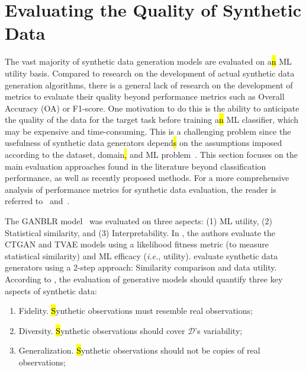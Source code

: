 \section{Evaluating the Quality of Synthetic Data
}\label{sec:evaluating-synthetic-data}

The vast majority of synthetic data generation models are evaluated on a\hl{n} ML
utility basis. Compared to research on the development of actual synthetic
data generation algorithms, there is a general lack of research on the
development of metrics to evaluate their quality beyond performance metrics
such as Overall Accuracy (OA) or F1-score.
One motivation to
do this is the ability to anticipate the quality of the data for the target
task before training a\hl{n} ML classifier, which may be expensive and
time-consuming. This is a challenging problem\hl{ }since the usefulness of
synthetic data generators depend\hl{s} on the assumptions imposed according to
the dataset, domain\hl{,} and ML problem~\cite{chundawat2022tabsyndex}. This
section focuses on the main evaluation approaches found in the literature
beyond classification performance, as well as recently proposed methods. For a
more comprehensive analysis of performance metrics for synthetic data
evaluation, the reader is referred to~\cite{dankar2022multi}
and~\cite{theis2016note}.

The GANBLR model~\cite{zhang2021ganblr} was evaluated on three aspects: (1) ML
utility, (2) Statistical similarity, and (3) Interpretability. In
\cite{xu2019modeling}, the authors evaluate the CTGAN and TVAE models using a
likelihood fitness metric (to measure statistical similarity) and ML efficacy
(\textit{i.e.}, utility). \cite{hittmeir2019utility} evaluate synthetic data
generators using a 2-step approach: Similarity comparison and data utility.
According to \cite{alaa2022faithful}, the evaluation of generative models
should quantify three key aspects of synthetic data:

\begin{enumerate}

    \item Fidelity. \hl{S}ynthetic observations must resemble real
        observations; 

    \item Diversity. \hl{S}ynthetic observations should cover $\mathcal{D}$'s
        variability;

    \item Generalization. \hl{S}ynthetic observations should not be copies of
        real observations;

\end{enumerate}


